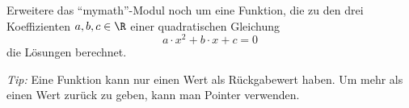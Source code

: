 \begin{aufg}
Erweitere das "`mymath"'-Modul noch um eine Funktion, die zu den drei Koeffizienten $a, b, c \in \R$ einer quadratischen Gleichung $$
a \cdot x^2 + b \cdot x + c = 0 $$
die Lösungen berechnet.

\medskip \noindent \emph{Tip:} Eine Funktion kann nur einen Wert als Rückgabewert haben. Um mehr als einen Wert zurück zu geben, kann man Pointer verwenden.
\end{aufg}